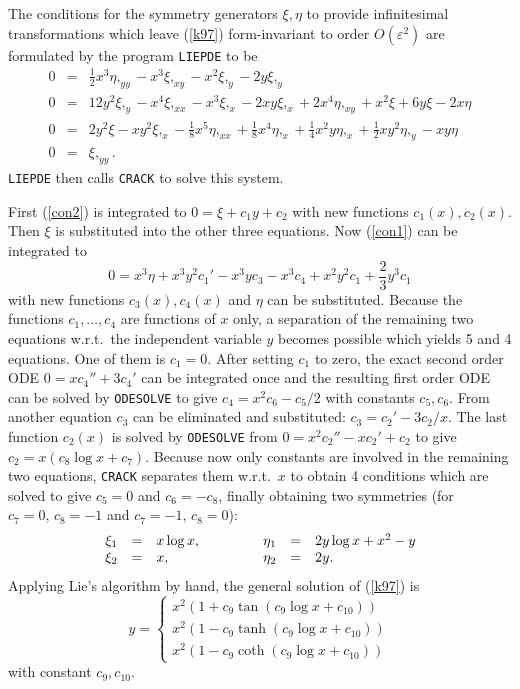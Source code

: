 The conditions for the symmetry generators $\xi, \eta$ to provide
infinitesimal transformations
which leave (\ref{k97}) form-invariant to order $O(\varepsilon^2)$ are
formulated by the program {\tt LIEPDE} to be
\begin{eqnarray}
0 & = & \frac{1}{2}x^3\eta,_{yy} - x^3\xi,_{xy} - x^2\xi,_y - 2y\xi,_y
        \label{con1} \\
0 & = & 12y^2\xi,_y - x^4\xi,_{xx} - x^3\xi,_x - 2xy\xi,_x
        + 2x^4\eta,_{xy} + x^2\xi + 6y\xi - 2x\eta  \\
0 & = & 2y^2\xi - xy^2\xi,_x - \frac{1}{8}x^5\eta,_{xx}
        + \frac{1}{8}x^4\eta,_x
        + \frac{1}{4}x^2y\eta,_x + \frac{1}{2}xy^2\eta,_y
        - xy\eta  \\
0 & = & \xi,_{yy}.   \label{con2}
\end{eqnarray}
{\tt LIEPDE} then calls {\tt CRACK} to solve this system.

First (\ref{con2}) is integrated to $0 = \xi + c_1y + c_2$
with new functions $c_1(x), c_2(x).$
Then $\xi$ is substituted into the other three equations. Now (\ref{con1})
can be integrated to
\[ 0 = x^3\eta + x^3y^2c_1' - x^3yc_3 - x^3c_4 + x^2y^2c_1
       + \frac{2}{3}y^3c_1 \]
with new functions $c_3(x), c_4(x)$ and $\eta$ can be substituted.
Because the functions $c_1,\ldots,c_4$ are functions of $x$ only,
a separation of the remaining two equations w.r.t.\ the independent
variable $y$ becomes possible which yields 5 and 4 equations. One of
them is $c_1=0$.
After setting $c_1$ to zero, the exact second order ODE
$0 = xc_4'' + 3c_4'$ can be integrated once and
the resulting first order ODE can be solved by
{\tt ODESOLVE} \cite{Mal} to give $c_4 = x^2c_6 - c_5/2$
with constants $c_5, c_6$. From another equation $c_3$ can be eliminated
and substituted: $c_3 = c_2' - 3c_2/x$. The last function $c_2(x)$ is
solved by {\tt ODESOLVE} from $0 = x^2c_2'' - xc_2' + c_2$ to give
$c_2 = x(c_8\log x + c_7)$. Because now only constants are involved in
the remaining two equations, {\tt CRACK} separates them w.r.t.\ $x$ to obtain 4
conditions which are solved to give $c_5 = 0$ and $c_6 = - c_8$,
finally obtaining two symmetries (for $c_7 = 0, \, c_8 = -1$ and
$c_7 = -1, \, c_8 = 0$):
\[
\begin{array}{rclrcl}
 \xi_1 & = & x\log x,\hspace{0.5in}  & \eta_1 & = & 2y\log x + x^2 - y \\
 \xi_2 & = & x,                      & \eta_2 & = & 2y .
\end{array} \]
Applying Lie's algorithm by hand, the general solution of (\ref{k97})
is \cite{Ka}
\[ y = \left\{ \begin{array}{l}
                 x^2(1 + c_9\tan(c_9\log x + c_{10})) \\
                 x^2(1 - c_9\tanh(c_9\log x + c_{10})) \\
                 x^2(1 - c_9\coth(c_9\log x + c_{10}))
               \end{array}
       \right. \]
with constant $c_9, c_{10}$.

